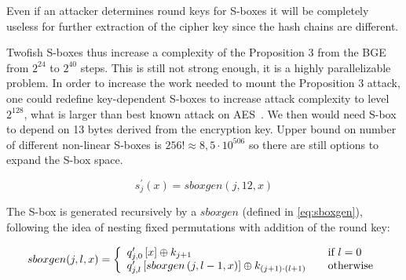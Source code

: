 \documentclass[11pt,oneside,final]{fithesis2}
\begin{document}
    Even if an attacker determines round keys for S-boxes it will be completely useless for further extraction of the cipher key since the hash chains are different. 
    
    Twofish S-boxes thus increase a complexity of the Proposition 3 from the BGE from $2^{24}$ to $2^{40}$ steps. This is still not strong enough, it is a highly parallelizable problem.
    In order to increase the work needed to mount the Proposition 3 attack, one could redefine key-dependent S-boxes to increase attack complexity to level $2^{128}$, what is larger
    than best known attack on AES~\citep{cryptoeprint:2011:449}. We then would need S-box to depend on 13 bytes derived from the encryption key. Upper bound on number of different 
    non-linear S-boxes is $256! \approx 8,5\cdot 10^{506}$ so there are still options to expand the S-box space. 
    
    \begin{equation}\label{eq:complex_sbox}
	s^{\prime}_{j}\left(x\right) = sboxgen(j,12,x)
    \end{equation}
    
    The S-box is generated recursively by a $sboxgen$ (defined in \ref{eq:sboxgen}), following the idea of nesting fixed permutations with addition of the round key:
    
    \begin{equation}\label{eq:sboxgen}
	sboxgen(j,l,x) = \left\{ 
	\begin{array}{l l}  
	    q^{\prime}_{j,0}\left[ x \right]                          \oplus k_{j+1}		            & \quad \text{if $l=0$}\\
	    q^{\prime}_{j,l}\left[sboxgen\left(j, l-1,x\right)\right] \oplus k_{(j+1) \cdot (l+1)}          & \quad \text{otherwise}
	\end{array} \right.
    \end{equation}
    
\end{document}
